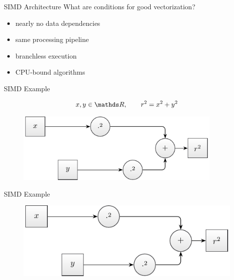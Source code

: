 \documentclass[aspectratio=169]{beamer}
\newcommand{\inputCodeBlock}[1]{%
    \begin{center}
        
    \end{center}
}
\begin{document}
    \begin{frame}{SIMD Architecture}
      What are conditions for good vectorization?
      \begin{itemize}
        \pause
        \item nearly no data dependencies
        \pause
        \item same processing pipeline
        \pause
        \item branchless execution
        \pause
        \item CPU-bound algorithms
      \end{itemize}
    \end{frame}

    \begin{frame}{SIMD Example}
      \begin{mybox}
        \[
          x,y\in\setReal, \qquad r^2 = x^2 + y^2
        \]
      \end{mybox}
      \pause
      \begin{minipage}{0.49\textwidth}
        \begin{figure}
          \includegraphics[width=0.9\textwidth]{figures/radius_operation.pdf}
        \end{figure}
      \end{minipage}
      \pause
      \begin{minipage}{0.49\textwidth}
        \inputCodeBlock{code/simd_example_scalar.cpp}
      \end{minipage}
    \end{frame}

    \begin{frame}{SIMD Example}
      \begin{figure}
        \includegraphics[scale=0.9]{figures/radius_operation.pdf}
      \end{figure}
    \end{frame}
\end{document}
